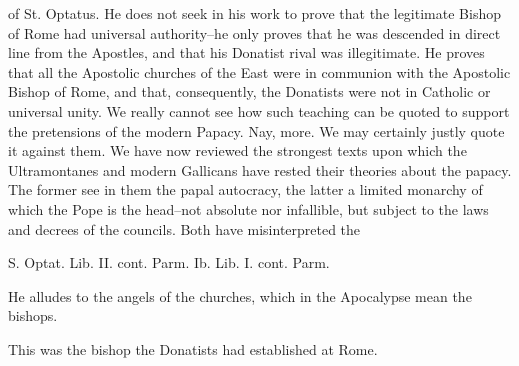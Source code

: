of St. Optatus. He does not seek in his work to prove that the legitimate Bishop of Rome had universal authority--he only proves that he was descended in direct line from the Apostles, and that his Donatist rival was illegitimate. He proves that all the Apostolic churches of the East were in communion with the Apostolic Bishop of Rome, and that, consequently, the Donatists were not in Catholic or universal unity. We really cannot see how such teaching can be quoted to support the pretensions of the modern Papacy. Nay, more. We may certainly justly quote it against them. We have now reviewed the strongest texts upon which the Ultramontanes and modern Gallicans have rested their theories about the papacy. The former see in them the papal autocracy, the latter a limited monarchy of which the Pope is the head--not absolute nor infallible, but subject to the laws and decrees of the councils. Both have misinterpreted the

S. Optat. Lib. II. cont. Parm. Ib. Lib. I. cont. Parm.

He alludes to the angels of the churches, which in the Apocalypse mean the bishops.

This was the bishop the Donatists had established at Rome.

